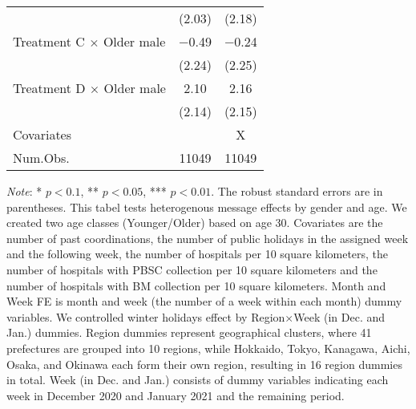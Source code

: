 \documentclass[12pt, a4paper]{article}
\begin{document}
\begin{table}[H]
\begin{threeparttable}
\begin{tabular}[t]{lcc}
 & (\num{2.03}) & (\num{2.18})\\
Treatment C $\times$ Older male & \num{-0.49} & \num{-0.24}\\
 & (\num{2.24}) & (\num{2.25})\\
Treatment D $\times$ Older male & \num{2.10} & \num{2.16}\\
 & (\num{2.14}) & (\num{2.15})\\
\midrule
Covariates &  & X\\
Num.Obs. & \num{11049} & \num{11049}\\
\bottomrule
\end{tabular}
\begin{tablenotes}
\item \emph{Note}: * $p < 0.1$, ** $p < 0.05$, *** $p < 0.01$. The robust standard errors are in parentheses. This tabel tests heterogenous message effects by gender and age. We created two age classes (Younger/Older) based on age 30. Covariates are the number of past coordinations, the number of public holidays in the assigned week and the following week, the number of hospitals per 10 square kilometers, the number of hospitals with PBSC collection per 10 square kilometers and the number of hospitals with BM collection per 10 square kilometers. Month and Week FE is month and week (the number of a week within each month) dummy variables. We controlled winter holidays effect by Region$\times$Week (in Dec. and Jan.) dummies. Region dummies represent geographical clusters, where 41 prefectures are grouped into 10 regions, while Hokkaido, Tokyo, Kanagawa, Aichi, Osaka, and Okinawa each form their own region, resulting in 16 region dummies in total. Week (in Dec. and Jan.) consists of dummy variables indicating each week in December 2020 and January 2021 and the remaining period.
\end{tablenotes}
\end{threeparttable}
\end{table}
\end{document}
